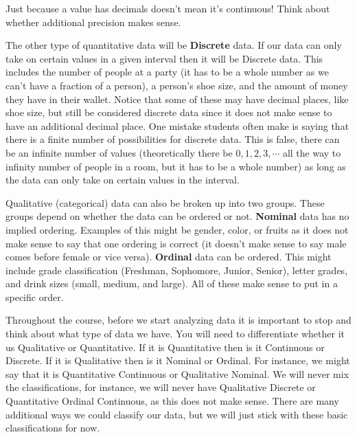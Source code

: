 \documentclass[
  letterpaper,
  DIV=11,
  numbers=noendperiod]{scrreprt}
\begin{document}
\begin{tcolorbox}[enhanced jigsaw, leftrule=.75mm, arc=.35mm, coltitle=black, rightrule=.15mm, bottomrule=.15mm, toprule=.15mm, left=2mm, colbacktitle=quarto-callout-warning-color!10!white, title=\textcolor{quarto-callout-warning-color}{\faExclamationTriangle}\hspace{0.5em}{Warning}, toptitle=1mm, breakable, colframe=quarto-callout-warning-color-frame, bottomtitle=1mm, titlerule=0mm, colback=white, opacityback=0, opacitybacktitle=0.6]

Just because a value has decimals doesn't mean it's continuous! Think
about whether additional precision makes sense.

\end{tcolorbox}

The other type of quantitative data will be \textbf{Discrete} data. If
our data can only take on certain values in a given interval then it
will be Discrete data. This includes the number of people at a party (it
has to be a whole number as we can't have a fraction of a person), a
person's shoe size, and the amount of money they have in their wallet.
Notice that some of these may have decimal places, like shoe size, but
still be considered discrete data since it does not make sense to have
an additional decimal place. One mistake students often make is saying
that there is a finite number of possibilities for discrete data. This
is false, there can be an infinite number of values (theoretically there
be \(0, 1, 2, 3, \cdots\) all the way to infinity number of people in a
room, but it has to be a whole number) as long as the data can only take
on certain values in the interval.

Qualitative (categorical) data can also be broken up into two groups.
These groups depend on whether the data can be ordered or not.
\textbf{Nominal} data has no implied ordering. Examples of this might be
gender, color, or fruits as it does not make sense to say that one
ordering is correct (it doesn't make sense to say male comes before
female or vice versa). \textbf{Ordinal} data can be ordered. This might
include grade classification (Freshman, Sophomore, Junior, Senior),
letter grades, and drink sizes (small, medium, and large). All of these
make sense to put in a specific order.

Throughout the course, before we start analyzing data it is important to
stop and think about what type of data we have. You will need to
differentiate whether it us Qualitative or Quantitative. If it is
Quantitative then is it Continuous or Discrete. If it is Qualitative
then is it Nominal or Ordinal. For instance, we might say that it is
Quantitative Continuous or Qualitative Nominal. We will never mix the
classifications, for instance, we will never have Qualitative Discrete
or Quantitative Ordinal Continuous, as this does not make sense. There
are many additional ways we could classify our data, but we will just
stick with these basic classifications for now.
\end{document}

